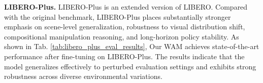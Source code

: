 \textbf{LIBERO-Plus.} 
LIBERO-Plus \citep{fei25libero-plus} is an extended version of LIBERO. Compared with the original benchmark, LIBERO-Plus places substantially stronger emphasis on scene-level generalization, robustness to visual distribution shift, compositional manipulation reasoning, and long-horizon policy stability. As shown in  Tab. \ref{tab:libero_plus_eval_results}, Our WAM achieves state-of-the-art performance after fine-tuning on LIBERO-Plus. The results indicate that the model generalizes effectively to perturbed evaluation settings and exhibits strong robustness across diverse environmental variations. 
\begin{table}[t]
\centering
    \caption{Results on LIBERO-plus benchmark.}
\label{tab:libero_plus_eval_results}
\end{table}
